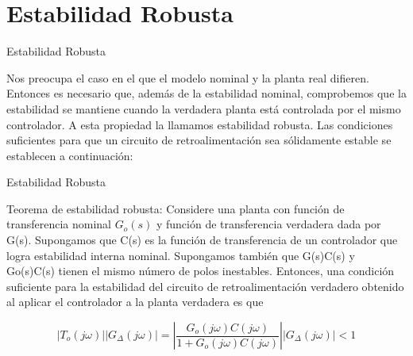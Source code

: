 \documentclass{beamer}
\begin{document}
\section{Estabilidad Robusta}
\begin{frame}{Estabilidad Robusta}
\begin{justify}
\begin{itemize}
\justifying
 Nos preocupa el caso en el que el modelo nominal y la planta real difieren. Entonces es necesario que, además de la estabilidad nominal, comprobemos que la estabilidad se mantiene cuando la verdadera planta está controlada por el mismo controlador. A esta propiedad la llamamos estabilidad robusta.
Las condiciones suficientes para que un circuito de retroalimentación sea sólidamente estable se establecen a continuación:

\end{itemize}
\end{justify}
\end{frame}

\begin{frame}{Estabilidad Robusta}
\begin{justify}

\begin{itemize}
\justifying
 Teorema de estabilidad robusta: Considere una planta con función de transferencia nominal $G_o(s)$ y función de transferencia verdadera dada por G(s). Supongamos que C(s) es la función de transferencia de un controlador que logra estabilidad interna nominal. Supongamos también que G(s)C(s) y Go(s)C(s) tienen el mismo número de polos inestables. Entonces, una condición suficiente para la estabilidad del circuito de retroalimentación verdadero obtenido al aplicar el controlador a la planta verdadera es que

 \begin{equation}\label{sensibilidad3}
    \left |{ T_{o } (j\omega)}  \right | \left |{ G_{\Delta } (j\omega)}  \right |=\left |\frac{G_o(j\omega)C(j\omega)}{1+G_o(j\omega)C(j\omega)}  \right | \left |{ G_{\Delta } (j\omega)}  \right |<1
\end{equation}
\end{itemize}

\end{justify}
\end{frame}
\end{document}
